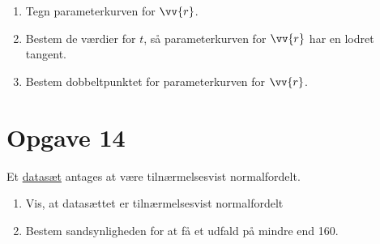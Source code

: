 \documentclass[12pt]{article}
\begin{document}
\begin{enumerate}[label=\roman*)]
	\item Tegn parameterkurven for $\vv{r}$.
	\item Bestem de værdier for $t$, så parameterkurven for $\vv{r}$ har en lodret tangent.
	\item Bestem dobbeltpunktet for parameterkurven for $\vv{r}$. 
\end{enumerate}

\section*{Opgave 14}
Et \href{https://github.com/ChristianJLex/TeachingNotes/raw/master/2022-2023/Data%20og%20lign/tr%C3%A6ningTilTermin.xlsx}{\color{blue!60} datasæt} antages at være tilnærmelsesvist normalfordelt. 
\begin{enumerate}[label=\roman*)]
	\item Vis, at datasættet er tilnærmelsesvist normalfordelt
	\item Bestem sandsynligheden for at få et udfald på mindre end 160. 
\end{enumerate}
\end{document}
